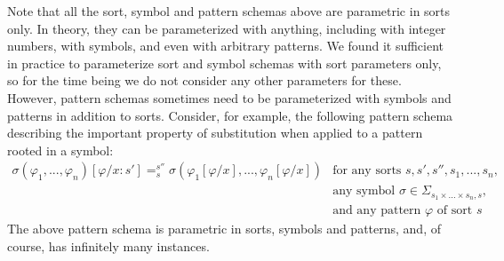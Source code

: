 \documentclass[UTF8,11pt]{article}
\theoremstyle{plain}
\theoremstyle{definition}
\theoremstyle{remark}
\begin{document}
Note that all the sort, symbol and pattern schemas above are parametric in
sorts only.
In theory, they can be parameterized with anything, including with integer
numbers, with symbols, and even with arbitrary patterns.
We found it sufficient in practice to parameterize sort and symbol schemas with
sort parameters only, so for the time being we do not consider any other
parameters for these.
However, pattern schemas sometimes need to be parameterized with symbols and
patterns in addition to sorts.
Consider, for example, the following pattern schema describing the important
property of substitution when applied to a pattern rooted in a symbol:
$$
\begin{array}{rl}
\sigma(\varphi_1,...,\varphi_n)[\varphi/x:s']
=_s^{s''} 
\sigma(\varphi_1[\varphi/x],...,\varphi_n[\varphi/x])
&
\textrm{for any sorts $s, s', s'', s_1,...,s_n$,}
\\
& \textrm{any symbol $\sigma\in\Sigma_{s_1\times...\times s_n, s}$,}
\\
& \textrm{and any pattern $\varphi$ of sort $s$}
\end{array}
$$
The above pattern schema is parametric in sorts, symbols and patterns, and,
of course, has infinitely many instances.
\end{document}

